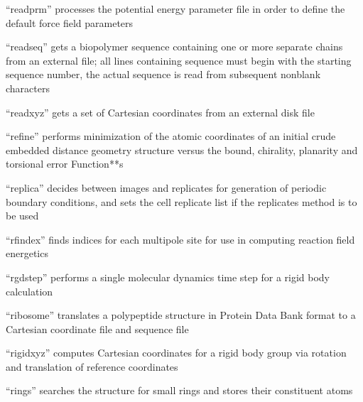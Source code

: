 \documentclass[letterpaper,11pt,english]{sphinxmanual}
\begin{document}

“readprm” processes the potential energy parameter file in order to define the default force field parameters


“readseq” gets a biopolymer sequence containing one or more separate chains from an external file; all lines containing sequence must begin with the starting sequence number, the actual sequence is read from subsequent nonblank characters


“readxyz” gets a set of Cartesian coordinates from an external disk file


“refine” performs minimization of the atomic coordinates of an initial crude embedded distance geometry structure versus the bound, chirality, planarity and torsional error Function**s



“replica” decides between images and replicates for generation of periodic boundary conditions, and sets the cell replicate list if the replicates method is to be used


“rfindex” finds indices for each multipole site for use in computing reaction field energetics



“rgdstep” performs a single molecular dynamics time step for a rigid body calculation


“ribosome” translates a polypeptide structure in Protein Data Bank format to a Cartesian coordinate file and sequence file


“rigidxyz” computes Cartesian coordinates for a rigid body group via rotation and translation of reference coordinates


“rings” searches the structure for small rings and stores their constituent atoms
\end{document}
